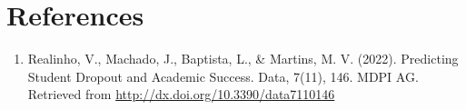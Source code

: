 \documentclass[
]{article}
\providecommand{\tightlist}{%
  \setlength{\itemsep}{0pt}\setlength{\parskip}{0pt}}
\begin{document}
\hypertarget{references}{%
\section{References}\label{references}}

\begin{enumerate}
\def\labelenumi{\arabic{enumi}.}
\tightlist
\item
  Realinho, V., Machado, J., Baptista, L., \& Martins, M. V. (2022).
  Predicting Student Dropout and Academic Success. Data, 7(11), 146.
  MDPI AG. Retrieved from \url{http://dx.doi.org/10.3390/data7110146}
\end{enumerate}
\end{document}
